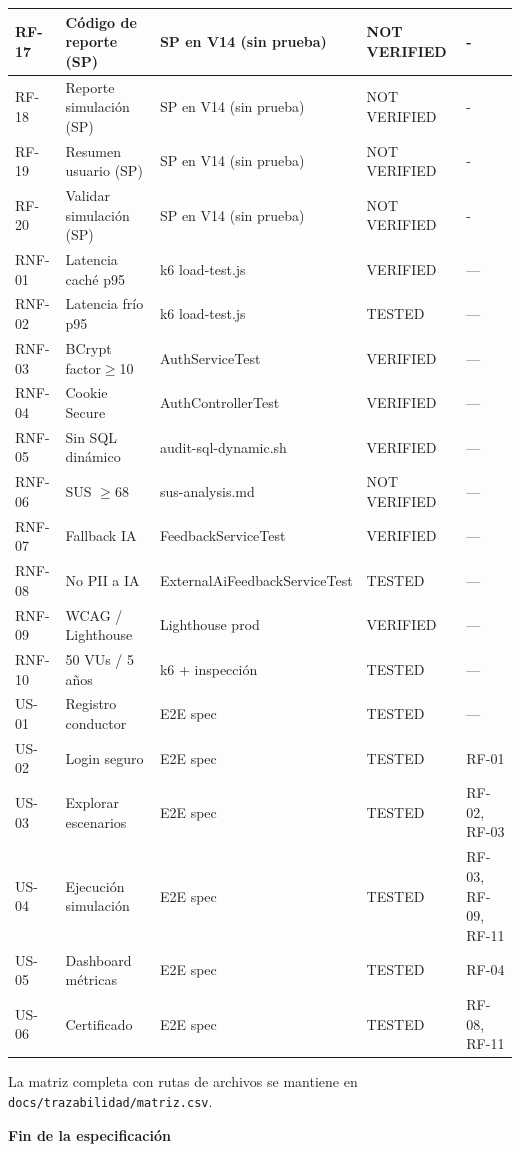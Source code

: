 \documentclass[11pt,a4paper]{article}
\begin{document}
\begin{longtable}{|p{1.6cm}|p{4.5cm}|p{3cm}|p{1.5cm}|p{2cm}|}
    RF-17 & Código de reporte (SP) & SP en V14 (sin prueba) & NOT VERIFIED & - \\ \hline
    RF-18 & Reporte simulación (SP) & SP en V14 (sin prueba) & NOT VERIFIED & - \\ \hline
    RF-19 & Resumen usuario (SP) & SP en V14 (sin prueba) & NOT VERIFIED & - \\ \hline
    RF-20 & Validar simulación (SP) & SP en V14 (sin prueba) & NOT VERIFIED & - \\ \hline
    RNF-01 & Latencia caché p95 & k6 load-test.js & VERIFIED & — \\ \hline
    RNF-02 & Latencia frío p95 & k6 load-test.js & TESTED & — \\ \hline
    RNF-03 & BCrypt factor$\geq$10 & AuthServiceTest & VERIFIED & — \\ \hline
    RNF-04 & Cookie Secure & AuthControllerTest & VERIFIED & — \\ \hline
    RNF-05 & Sin SQL dinámico & audit-sql-dynamic.sh & VERIFIED & — \\ \hline
    RNF-06 & SUS $\ge$68 & sus-analysis.md & NOT VERIFIED & — \\ \hline
    RNF-07 & Fallback IA & FeedbackServiceTest & VERIFIED & — \\ \hline
    RNF-08 & No PII a IA & ExternalAiFeedbackServiceTest & TESTED & — \\ \hline
    RNF-09 & WCAG / Lighthouse & Lighthouse prod & VERIFIED & — \\ \hline
    RNF-10 & 50 VUs / 5 años & k6 + inspección & TESTED & — \\ \hline
    US-01 & Registro conductor & E2E spec & TESTED & — \\ \hline
    US-02 & Login seguro & E2E spec & TESTED & RF-01 \\ \hline
    US-03 & Explorar escenarios & E2E spec & TESTED & RF-02, RF-03 \\ \hline
    US-04 & Ejecución simulación & E2E spec & TESTED & RF-03, RF-09, RF-11 \\ \hline
    US-05 & Dashboard métricas & E2E spec & TESTED & RF-04 \\ \hline
    US-06 & Certificado & E2E spec & TESTED & RF-08, RF-11 \\ \hline
\end{longtable}

La matriz completa con rutas de archivos se mantiene en \texttt{docs/trazabilidad/matriz.csv}.

\vspace{1cm}
\noindent\textbf{\Large Fin de la especificación}
\end{document}
